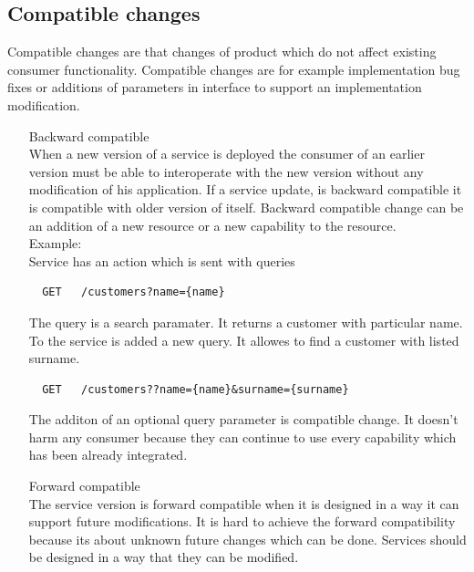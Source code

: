 \subsection{Compatible changes}
  Compatible changes are that changes of product which do not affect existing consumer functionality. Compatible changes are for example implementation bug fixes or additions of parameters in interface to support an implementation modification.
  \begin{enumerate}
    \item[Backward compatible] \hfill \\ 
  When a new version of a service is deployed the consumer of an earlier version must be able to interoperate with the new version without any modification of his application. If a service update, is backward compatible it is compatible with older version of itself. Backward compatible change can be an addition of a new resource or a new capability to the resource. \hfill \\ 
  Example: \hfill \\ 
  Service has an action which is sent with \gls{queries} \hfill \\ 
  \begin{lstlisting}
  GET   /customers?name={name}
  \end{lstlisting}
  The query is a search paramater. It returns a customer with particular name. To the service is added a new query. It allowes to find a customer with listed surname. 
  \begin{lstlisting}
  GET   /customers??name={name}&surname={surname}
  \end{lstlisting}

  The additon of an optional query parameter is compatible change. It doesn't harm any consumer because they can continue to use every capability which has been already integrated.
  
  \item[Forward compatible] \hfill \\
  The service version is forward compatible when it is designed in a way it can support future modifications. It is hard to achieve the forward compatibility because its about unknown future changes which can be done. Services should be designed in a way that they can be modified.
  \end{enumerate}
  
